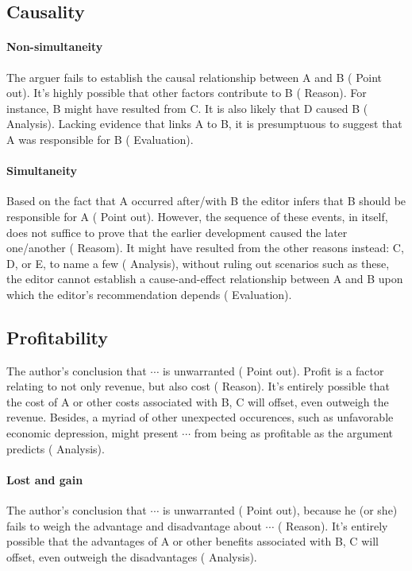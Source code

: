 \subsection{Causality}
\paragraph{Non-simultaneity}
The arguer fails to establish the causal relationship between A and B ({\color{red} Point out}).
It's highly possible that other factors contribute to B ({\color{red} Reason}).
For instance, B might have resulted from C.
It is also likely that D caused B ({\color{red} Analysis}).
Lacking evidence that links A to B, it is presumptuous to suggest that A was responsible for B ({\color{red} Evaluation}).

\paragraph{Simultaneity}
Based on the fact that A occurred after/with B the editor infers that B should be responsible for A ({\color{red} Point out}).
However, the sequence of these events, in itself, does not suffice to prove that the earlier development caused the later one/another ({\color{red} Reasom}).
It might have resulted from the other reasons instead: C, D, or E, to name a few ({\color{red} Analysis}), without ruling out scenarios such as these, the editor cannot establish a cause-and-effect relationship between A and B upon which the editor's recommendation depends ({\color{red} Evaluation}).

\subsection{Profitability}
The author's conclusion that \(\cdots\) is unwarranted ({\color{red} Point out}).
Profit is a factor relating to not only revenue, but also cost ({\color{red} Reason}).
It's entirely possible that the cost of A or other costs associated with B, C will offset, even outweigh the revenue.
Besides, a myriad of other unexpected occurences, such as unfavorable economic depression, might present \(\cdots\) from being as profitable as the argument predicts ({\color{red} Analysis}).

\paragraph{Lost and gain}
The author's conclusion that \(\cdots\) is unwarranted ({\color{red} Point out}), because he (or she) fails to weigh the advantage and disadvantage about \(\cdots\) ({\color{red} Reason}).
It's entirely possible that the advantages of A or other benefits associated with B, C will offset, even outweigh the disadvantages ({\color{red} Analysis}).